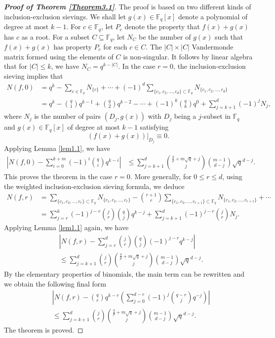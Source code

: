 \documentclass[reqno]{amsart}
\theoremstyle{remark}
\numberwithin{equation}{section}
\newcommand{\f}{\mathbb{F}_q}
\begin{document}
\begin{proof}[{\bf Proof of Theorem \ref{Theorem3.1}}]
The proof is based on two different kinds of inclusion-exclusion sievings.
We shall let $g(x) \in \f[x]$ denote a polynomial of degree at most $k-1$.
For $c\in \f$, let $P_c$ denote the
property that $f(x)+g(x)$ has $c$ as a root. For a subset $C\subseteq \f$,  let  $N_C$  be the number of $g(x)$ such that $f(x)+g(x)$
has property $P_c$ for each $c\in {C}$.  The $|C|\times |C|$ Vandermonde matrix formed using the elements of ${C}$ is non-singular.
It follows by linear algebra that for $|C|\leq k$, we have $N_C=q^{k-|C|}$.
In the case $r=0$,
the inclusion-exclusion sieving \cite{St} implies that
 \begin{align*}
N(f, 0)&=q^k-\sum_{c\in \f}N_{\{c\}}+
\cdots+(-1)^{d}\sum_{\{c_1, c_2, \dots, c_{d}\}\subset \f}N_{\{c_1, c_2, \dots, c_{d}\}}\\
&=q^k-{q \choose 1} q^{k-1}+{q \choose 2} q^{k-2}-\cdots+(-1)^k{q \choose k} q^{0}+\sum_{j=k+1}^d(-1)^j N_j,
 \end{align*}
where $N_j$ is the number of pairs $(D_j, g(x))$ with $D_j$ being a $j$-subset in $\f$ and $g(x)\in \f[x]$ of degree at most $k-1$ satisfying
$$ (f(x)+g(x))|_{D_j} \equiv 0.$$
Applying Lemma \ref{lem1.1}, we have
\begin{align*}
\left|N(f, 0)-\sum_{i=0}^{k+m} (-1)^i {q \choose i}q^{k-i}
\right|&\leq \sum_{j=k+1}^d{\frac {q}p+m\sqrt{q}+j \choose j}{m-1 \choose d-j} \sqrt{q}^{d-j}.
 \end{align*}
This proves the theorem in the case $r=0$. More generally,
for $0\leq r\leq d$, using the weighted inclusion-exclusion sieving formula,  we deduce
\begin{align*}
N(f, r)&=\sum_{\{c_1, c_2, \dots, c_{r}\}\subset \f}N_{\{c_1, c_2, \dots, c_{r}\}}-{r+1 \choose r} \sum_{\{c_1, c_2, \dots, c_{r+1}\}\subset \f}N_{\{c_1, c_2, \dots, c_{r+1}\}}+\cdots\\
 &=\sum_{j=r}^{k} (-1)^{j-r} {j \choose r}{q \choose j} q^{k-j}+\sum_{j=k+1}^d(-1)^{j-r} {j \choose r}N_j.
 \end{align*}
Applying Lemma \ref{lem1.1} again, we have
\begin{align*}
&\left|N(f, r)-\sum_{j=r}^{d} {j \choose r}{q \choose j}(-1)^{j-r} q^{k-j}
\right|\\
&\leq \sum_{j=k+1}^d{j \choose r}{\frac {q}p+m\sqrt{q}+j \choose j}{m-1 \choose d-j} \sqrt{q}^{d-j}.
  \end{align*}
By the elementary properties of binomials, the main term can be rewritten and we obtain the following final form
\begin{align*}
&\left|N(f, r)-{q \choose r}q^{k-r}\displaystyle{\left(\sum_{j=0}^{d-r} (-1)^{j}{q-r \choose j} q^{-j}\right)}
\right|\\
&\leq \sum_{j=k+1}^d{j \choose r}{\frac {q}p+m\sqrt{q}+j \choose j}{m-1 \choose d-j} \sqrt{q}^{d-j}.
 \end{align*}
The theorem is proved.
\end{proof}
\end{document}
